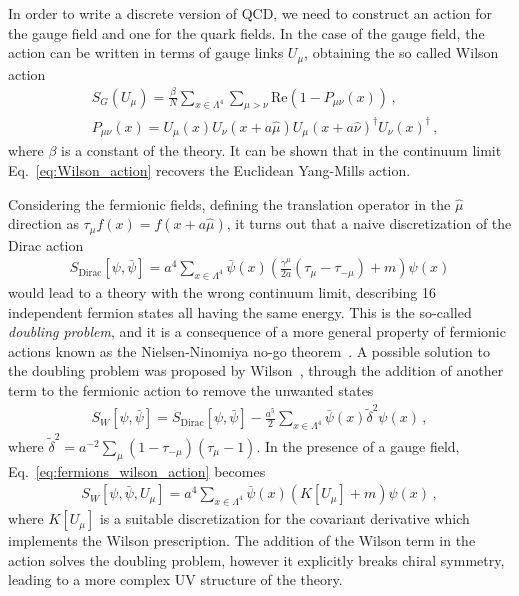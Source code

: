 %
In order to write a discrete version of QCD, we need to construct an action for the gauge field and one for the quark fields.
In the case of the gauge field, the action can be written in terms of gauge links $U_{\mu}$, obtaining the so called Wilson action
\begin{align}
    \label{eq:Wilson_action}
    &S_G\left(U_{\mu}\right) = 
    \frac{\beta}{N}\sum_{x\in \Lambda^4}\sum_{\mu>\nu}\text{Re}\left(1-P_{\mu\nu}\left(x\right)\right)\,, \\
    &P_{\mu\nu}\left(x\right) = U_{\mu}\left(x\right)U_{\nu}\left(x+a\hat{\mu}\right)
    U_{\mu}\left(x+a\hat{\nu}\right)^{\dagger}U_{\nu}\left(x\right)^{\dagger}\,,
\end{align}
where $\beta$ is a constant of the theory. It can be shown that in the continuum limit Eq.~\eqref{eq:Wilson_action}
recovers the Euclidean Yang-Mills action.

%
Considering the fermionic fields, defining the translation operator in the $\hat{\mu}$ direction as 
$\tau_{\mu}f\left(x\right) = f\left(x+a\hat{\mu}\right)$, 
it turns out that a naive discretization of the Dirac action
\begin{align}
    \label{eq:naive_Dirac}
    S_{\text{Dirac}}\left[\psi,\bar{\psi}\right] = 
    a^4\sum_{x\in\Lambda^4}\bar{\psi}\left(x\right)\left(\frac{\gamma^{\mu}}{2a}\left(\tau_{\mu}-\tau_{-\mu}\right) + m\right) \psi\left(x\right)
\end{align}
would lead to a theory with the wrong continuum limit, describing 16 independent fermion states all having the same energy.
This is the so-called \textit{doubling problem}, and it is a consequence of a more general property of 
fermionic actions known as the Nielsen-Ninomiya no-go theorem~\cite{Nielsen:1981hk}.
A possible solution to the doubling problem was proposed by Wilson~\cite{PhysRevD.10.2445}, through the addition of another term to the fermionic action
to remove the unwanted states
\begin{align}
    \label{eq:fermions_wilson_action}
    S_W\left[\psi,\bar{\psi}\right] = S_{\text{Dirac}}\left[\psi,\bar{\psi}\right] 
    - \frac{a^5}{2}\sum_{x\in\Lambda^4}\bar{\psi}\left(x\right)\tilde{\delta}^2 \psi\left(x\right)\,,
\end{align}
where $\tilde{\delta}^2 = a^{-2}\sum_{\mu}\left(1-\tau_{-\mu}\right)\left(\tau_{\mu}-1\right)$.
In the presence of a gauge field, Eq.~\eqref{eq:fermions_wilson_action} becomes 
\begin{align}
    S_W\left[\psi,\bar{\psi}, U_{\mu}\right] = a^4\sum_{x\in\Lambda^4}\bar{\psi}\left(x\right)\left(K\left[U_{\mu}\right] + m\right)\psi\left(x\right)\,,
\end{align}
where $K\left[U_{\mu}\right]$ is a suitable discretization for the covariant derivative which implements
the Wilson prescription. 
The addition of the Wilson term in the action solves the doubling problem, however it explicitly breaks
chiral symmetry, leading to a more complex UV structure of the theory.

